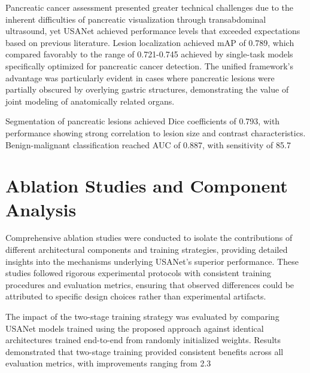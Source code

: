 Pancreatic cancer assessment presented greater technical challenges due to the inherent difficulties of pancreatic visualization through transabdominal ultrasound, yet USANet achieved performance levels that exceeded expectations based on previous literature. Lesion localization achieved mAP of 0.789, which compared favorably to the range of 0.721-0.745 achieved by single-task models specifically optimized for pancreatic cancer detection. The unified framework's advantage was particularly evident in cases where pancreatic lesions were partially obscured by overlying gastric structures, demonstrating the value of joint modeling of anatomically related organs.

Segmentation of pancreatic lesions achieved Dice coefficients of 0.793, with performance showing strong correlation to lesion size and contrast characteristics. Benign-malignant classification reached AUC of 0.887, with sensitivity of 85.7%

\section{Ablation Studies and Component Analysis}

Comprehensive ablation studies were conducted to isolate the contributions of different architectural components and training strategies, providing detailed insights into the mechanisms underlying USANet's superior performance. These studies followed rigorous experimental protocols with consistent training procedures and evaluation metrics, ensuring that observed differences could be attributed to specific design choices rather than experimental artifacts.

The impact of the two-stage training strategy was evaluated by comparing USANet models trained using the proposed approach against identical architectures trained end-to-end from randomly initialized weights. Results demonstrated that two-stage training provided consistent benefits across all evaluation metrics, with improvements ranging from 2.3%

